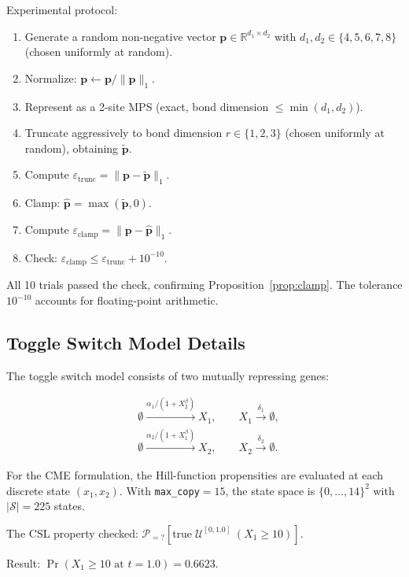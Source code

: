 \documentclass[11pt]{article}
\newcommand{\norm}[1]{\lVert #1 \rVert}
\newcommand{\R}{\mathbb{R}}
\newcommand{\eps}{\varepsilon}
\newcommand{\calS}{\mathcal{S}}
\begin{document}
Experimental protocol:
\begin{enumerate}[itemsep=1pt]
\item Generate a random non-negative vector $\mathbf{p} \in \R^{d_1 \times d_2}$
  with $d_1, d_2 \in \{4,5,6,7,8\}$ (chosen uniformly at random).
\item Normalize: $\mathbf{p} \leftarrow \mathbf{p} / \norm{\mathbf{p}}_1$.
\item Represent as a 2-site MPS (exact, bond dimension $\leq \min(d_1,d_2)$).
\item Truncate aggressively to bond dimension $r \in \{1,2,3\}$
  (chosen uniformly at random), obtaining $\tilde{\mathbf{p}}$.
\item Compute $\eps_{\mathrm{trunc}} = \norm{\mathbf{p} - \tilde{\mathbf{p}}}_1$.
\item Clamp: $\hat{\mathbf{p}} = \max(\tilde{\mathbf{p}}, 0)$.
\item Compute $\eps_{\mathrm{clamp}} = \norm{\mathbf{p} - \hat{\mathbf{p}}}_1$.
\item Check: $\eps_{\mathrm{clamp}} \leq \eps_{\mathrm{trunc}} + 10^{-10}$.
\end{enumerate}

All 10 trials passed the check, confirming
Proposition~\ref{prop:clamp}.
The tolerance $10^{-10}$ accounts for floating-point arithmetic.

\subsection{Toggle Switch Model Details}

The toggle switch model consists of two mutually repressing genes:

\begin{align}
  &\emptyset \xrightarrow{\alpha_1/(1 + X_2^{\beta})} X_1, \qquad
  X_1 \xrightarrow{\delta_1} \emptyset, \nonumber\\
  &\emptyset \xrightarrow{\alpha_2/(1 + X_1^{\beta})} X_2, \qquad
  X_2 \xrightarrow{\delta_2} \emptyset. \nonumber
\end{align}

For the CME formulation, the Hill-function propensities are evaluated
at each discrete state $(x_1, x_2)$.
With \texttt{max\_copy}${}=15$, the state space is $\{0,\ldots,14\}^2$
with $|\calS| = 225$ states.

The CSL property checked:
$\mathcal{P}_{=?}[\text{true}\;\mathcal{U}^{[0,1.0]}\;(X_1 \geq 10)]$.

Result: $\Pr(X_1 \geq 10 \text{ at } t=1.0) = 0.6623$.
\end{document}
